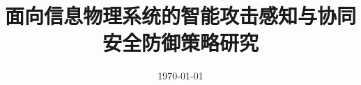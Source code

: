 \documentclass[UTF8,a4paper,twoside,12pt]{article}
\begin{document}
\title{面向信息物理系统的智能攻击感知与协同安全防御策略研究}
\author{}
\date{\today}

\maketitle

\newpage

\tableofcontents

\newpage





\end{document}
